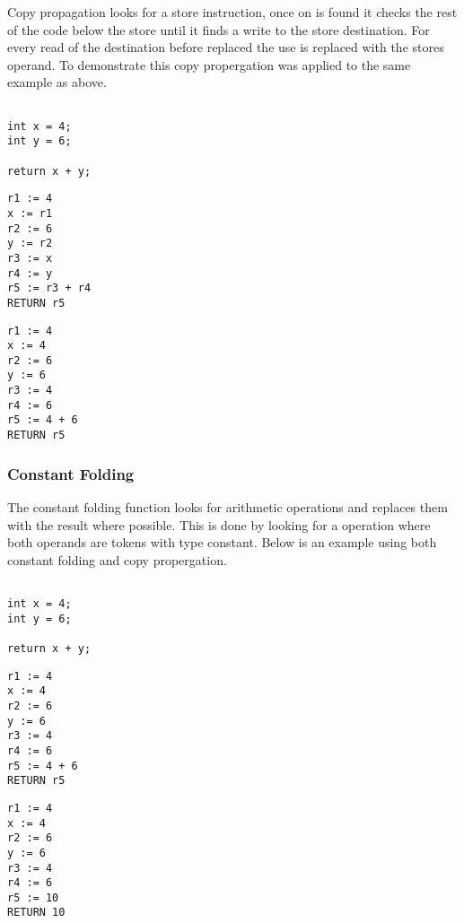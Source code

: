 \documentclass{article}
\begin{document}
Copy propagation looks for a store instruction, once on is found it checks the
rest of the code below the store until it finds a write to the store destination.
For every read of the destination before replaced the use is replaced with the
stores operand. To demonstrate this copy propergation was applied to the same example
as above.

\begin{minipage}{0.3\textwidth}
\begin{lstlisting}

int x = 4;
int y = 6;

return x + y;

\end{lstlisting}
\end{minipage}%
\begin{minipage}{0.3\textwidth}
\begin{lstlisting}
r1 := 4
x := r1
r2 := 6
y := r2
r3 := x
r4 := y
r5 := r3 + r4
RETURN r5

\end{lstlisting}
\end{minipage}%
\begin{minipage}{0.3\textwidth}
\begin{lstlisting}
r1 := 4
x := 4
r2 := 6
y := 6
r3 := 4
r4 := 6
r5 := 4 + 6
RETURN r5
\end{lstlisting}
\end{minipage}%

\subsubsection{Constant Folding}

The constant folding function looks for arithmetic operations and replaces them
with the result where possible. This is done by looking for a operation where both
operands are tokens with type constant. Below is an example using both constant
folding and copy propergation.

\begin{minipage}{0.3\textwidth}
\begin{lstlisting}

int x = 4;
int y = 6;

return x + y;

\end{lstlisting}
\end{minipage}%
\begin{minipage}{0.3\textwidth}
\begin{lstlisting}
r1 := 4
x := 4
r2 := 6
y := 6
r3 := 4
r4 := 6
r5 := 4 + 6
RETURN r5

\end{lstlisting}
\end{minipage}%
\begin{minipage}{0.3\textwidth}
\begin{lstlisting}
r1 := 4
x := 4
r2 := 6
y := 6
r3 := 4
r4 := 6
r5 := 10
RETURN 10
\end{lstlisting}
\end{minipage}%
\end{document}
